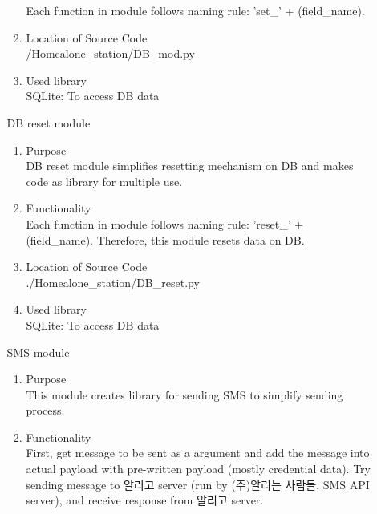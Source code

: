 \documentclass[conference]{IEEEtran}
\begin{document}
\begin{enumerate}[label=\arabic*.]
\begin{enumerate}[label=\arabic*.]
\begin{enumerate}[label=\alph*.]
        Each function in module follows naming rule: 'set\_' + (field\_name). \\
        \item {\large{Location of Source Code}}\\
        /Homealone\_station/DB\_mod.py\\
        \item {\large{Used library}} \\
        SQLite: To access DB data
    \end{enumerate}
    \begin{center}\large{DB reset module}\end{center} 
    \begin{enumerate}[label=\alph*.]
        \item {\large{Purpose }}\\
        DB reset module simplifies resetting mechanism on DB and makes code as library for multiple use.\\
        \item {\large{Functionality }}\\
        Each function in  module follows naming rule: 'reset\_' + (field\_name). Therefore, this module resets data on DB.\\
        \item {\large{Location of Source Code}}\\
        ./Homealone\_station/DB\_reset.py\\
        \item {\large{Used library}} \\
        SQLite: To access DB data
    \end{enumerate}  
    \begin{center}\large{SMS module}\end{center} 
    \begin{enumerate}[label=\alph*.]
        \item {\large{Purpose}}\\
        This module creates library for sending SMS to simplify sending process. \\
        \item {\large{Functionality}}\\
        First, get message to be sent as a argument and add the message into actual payload with pre-written payload (mostly credential data). Try sending message to 알리고 server (run by (주)알리는 사람들, SMS API server), and receive response from 알리고 server.\\

\end{enumerate}
\end{enumerate}
\end{enumerate}
\end{document}

